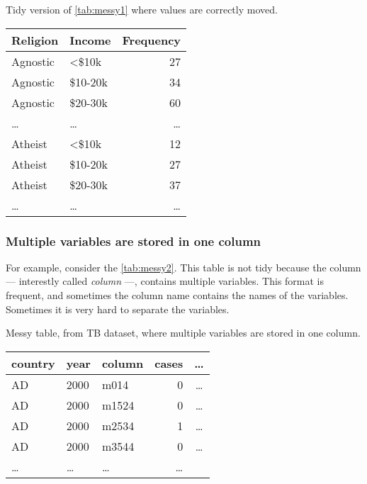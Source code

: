 \begin{tablebox}[label=tab:tidy1]{Tidy version of \cref{tab:messy1} where values are correctly moved.}
  \centering
  \begin{tabular}{l l r}
    \toprule
    Religion & Income & Frequency \\
    \midrule
    Agnostic & <\$10k & 27 \\
    Agnostic & \$10-20k & 34 \\
    Agnostic & \$20-30k & 60 \\
    \dots & \dots & \dots \\
    Atheist & <\$10k & 12 \\
    Atheist & \$10-20k & 27 \\
    Atheist & \$20-30k & 37 \\
    \dots & \dots & \dots \\
    \bottomrule
  \end{tabular}
\end{tablebox}

\clearpage
\subsubsection{Multiple variables are stored in one column}  For example, consider the
\cref{tab:messy2}.  This table is not tidy because the column --- interestly called
\emph{column} ---, contains multiple variables.  This format is frequent, and sometimes the
column name contains the names of the variables.  Sometimes it is very hard to separate
the variables.

\begin{tablebox}[label=tab:messy2]{Messy table, from TB dataset, where multiple variables are stored in one column.}
  \centering
  \begin{tabular}{l l l r c}
    \toprule
    country & year & column & cases & \dots \\
    \midrule
    AD & 2000 & m014 & 0 & \dots \\
    AD & 2000 & m1524 & 0 & \dots \\
    AD & 2000 & m2534 & 1 & \dots \\
    AD & 2000 & m3544 & 0 & \dots \\
    \dots & \dots & \dots & \dots \\
    \bottomrule
  \end{tabular}
\end{tablebox}

